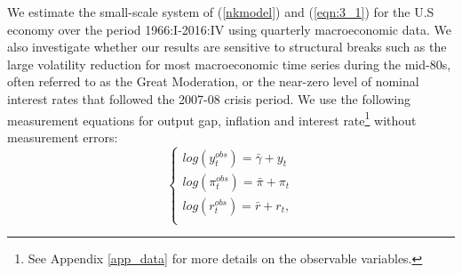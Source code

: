 We estimate the small-scale system of  (\ref{nkmodel}) and (\ref{eqn:3_1}) for the U.S economy over the period 1966:I-2016:IV using quarterly macroeconomic data. We also investigate whether our results are sensitive to structural breaks such as the large volatility reduction for most macroeconomic time series during the mid-80s, often referred to as the Great Moderation, or the near-zero level of nominal interest rates that followed the 2007-08 crisis period. 
We use the following measurement equations for output gap, inflation and interest rate\footnote{See Appendix \ref{app_data} for more details on the observable variables.} without measurement errors:
\begin{equation}
\begin{cases}
log(y_t^{obs})= \bar{\gamma}+y_t \\
log(\pi_t^{obs})=\bar{\pi} + \pi_t\\
log(r_t^{obs}) = \bar{r} + r_t, \\
\end{cases}
\label{eqn:3_2}
\end{equation}
\noindent
